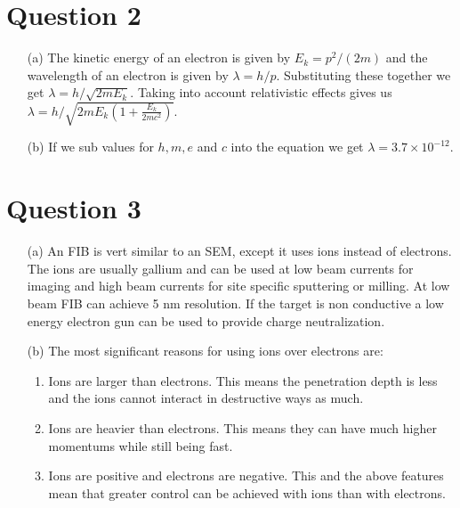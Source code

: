 \documentclass[10pt,a4paper]{article}
\begin{document}
\section*{Question 2}

\begin{itemize}
	\item[(a)] The kinetic energy of an electron is given by $E_{k} = p^{2}/(2m)$ and the wavelength of an electron is given by $\lambda = h/p$. Substituting these together we get $\lambda = h/\sqrt{2mE_{k}}$. Taking into account relativistic effects gives us $\lambda = h/\sqrt{2mE_{k}(1+\frac{E_{k}}{2mc^{2}})}$.
	\item[(b)] If we sub values for $h, m, e $ and $c$ into the equation we get $\lambda = 3.7 \times 10^{-12}$.
\end{itemize}

\section*{Question 3}

\begin{itemize}
	\item[(a)] An FIB is vert similar to an SEM, except it uses ions instead of electrons. The ions are usually gallium and can be used at low beam currents for imaging and high beam currents for site specific sputtering or milling. At low beam FIB can achieve 5 nm resolution. If the target is non conductive a low energy electron gun can be used to provide charge neutralization.
	\item[(b)] The most significant reasons for using ions over electrons are:
        \begin{enumerate}
            \item Ions are larger than electrons. This means the penetration depth is less and the ions cannot interact in destructive ways as much.
            \item Ions are heavier than electrons. This means they can have much higher momentums while still being fast.
            \item Ions are positive and electrons are negative. This and the above features mean that greater control can be achieved with ions than with electrons.
        \end{enumerate}
\end{itemize}
\end{document}
